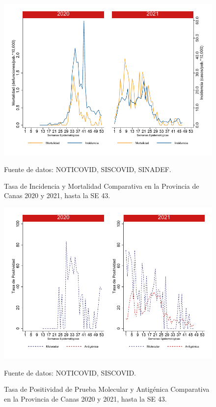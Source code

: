 \documentclass[12pt,a4paper,openany]{book}
\begin{document}
		\begin{figure}[h]
			\caption{Tasa de Incidencia y Mortalidad Comparativa en la Provincia de Canas 2020 y 2021, hasta la SE 43.}\label{fig:inc_mort_canchis}
			\begin{center}
				\includegraphics[width=0.7\linewidth]{../figuras/incidencia_mortalidad_20_21_5}
			\end{center}
			{\footnotesize {Fuente de datos: NOTICOVID, SISCOVID, SINADEF.}}
		\end{figure}
		
		\begin{figure}[h]
			\caption{Tasa de Positividad de Prueba Molecular y Antigénica Comparativa en la Provincia de Canas 2020 y 2021, hasta la SE 43.}\label{fig:positividad_canchis}
			\begin{center}
				\includegraphics[width=0.7\linewidth]{../figuras/positividad_20_21_5}
			\end{center}
			{\footnotesize {Fuente de datos: NOTICOVID, SISCOVID.}}
		\end{figure}
		
\end{document}
